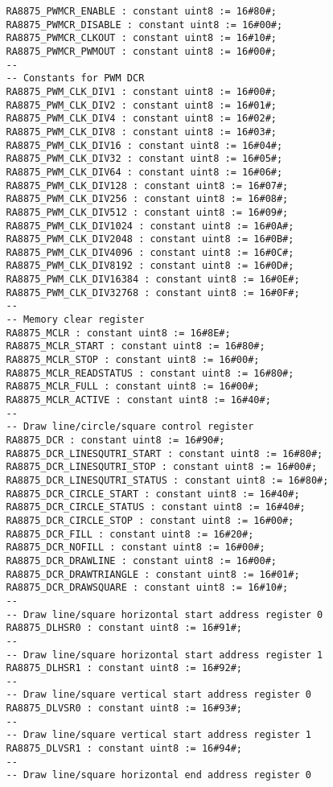 \documentclass[10pt, openany]{book}
\begin{document}
\begin{lstlisting}
   RA8875_PWMCR_ENABLE : constant uint8 := 16#80#;
   RA8875_PWMCR_DISABLE : constant uint8 := 16#00#;
   RA8875_PWMCR_CLKOUT : constant uint8 := 16#10#;
   RA8875_PWMCR_PWMOUT : constant uint8 := 16#00#;
   --
   -- Constants for PWM DCR
   RA8875_PWM_CLK_DIV1 : constant uint8 := 16#00#;
   RA8875_PWM_CLK_DIV2 : constant uint8 := 16#01#;
   RA8875_PWM_CLK_DIV4 : constant uint8 := 16#02#;
   RA8875_PWM_CLK_DIV8 : constant uint8 := 16#03#;
   RA8875_PWM_CLK_DIV16 : constant uint8 := 16#04#;
   RA8875_PWM_CLK_DIV32 : constant uint8 := 16#05#;
   RA8875_PWM_CLK_DIV64 : constant uint8 := 16#06#;
   RA8875_PWM_CLK_DIV128 : constant uint8 := 16#07#;
   RA8875_PWM_CLK_DIV256 : constant uint8 := 16#08#;
   RA8875_PWM_CLK_DIV512 : constant uint8 := 16#09#;
   RA8875_PWM_CLK_DIV1024 : constant uint8 := 16#0A#;
   RA8875_PWM_CLK_DIV2048 : constant uint8 := 16#0B#;
   RA8875_PWM_CLK_DIV4096 : constant uint8 := 16#0C#;
   RA8875_PWM_CLK_DIV8192 : constant uint8 := 16#0D#;
   RA8875_PWM_CLK_DIV16384 : constant uint8 := 16#0E#;
   RA8875_PWM_CLK_DIV32768 : constant uint8 := 16#0F#;
   --
   -- Memory clear register
   RA8875_MCLR : constant uint8 := 16#8E#;
   RA8875_MCLR_START : constant uint8 := 16#80#;
   RA8875_MCLR_STOP : constant uint8 := 16#00#;
   RA8875_MCLR_READSTATUS : constant uint8 := 16#80#;
   RA8875_MCLR_FULL : constant uint8 := 16#00#;
   RA8875_MCLR_ACTIVE : constant uint8 := 16#40#;
   --
   -- Draw line/circle/square control register
   RA8875_DCR : constant uint8 := 16#90#;
   RA8875_DCR_LINESQUTRI_START : constant uint8 := 16#80#;
   RA8875_DCR_LINESQUTRI_STOP : constant uint8 := 16#00#;
   RA8875_DCR_LINESQUTRI_STATUS : constant uint8 := 16#80#;
   RA8875_DCR_CIRCLE_START : constant uint8 := 16#40#;
   RA8875_DCR_CIRCLE_STATUS : constant uint8 := 16#40#;
   RA8875_DCR_CIRCLE_STOP : constant uint8 := 16#00#;
   RA8875_DCR_FILL : constant uint8 := 16#20#;
   RA8875_DCR_NOFILL : constant uint8 := 16#00#;
   RA8875_DCR_DRAWLINE : constant uint8 := 16#00#;
   RA8875_DCR_DRAWTRIANGLE : constant uint8 := 16#01#;
   RA8875_DCR_DRAWSQUARE : constant uint8 := 16#10#;
   --
   -- Draw line/square horizontal start address register 0
   RA8875_DLHSR0 : constant uint8 := 16#91#;
   --
   -- Draw line/square horizontal start address register 1
   RA8875_DLHSR1 : constant uint8 := 16#92#;
   --
   -- Draw line/square vertical start address register 0
   RA8875_DLVSR0 : constant uint8 := 16#93#;
   --
   -- Draw line/square vertical start address register 1
   RA8875_DLVSR1 : constant uint8 := 16#94#;
   --
   -- Draw line/square horizontal end address register 0

\end{lstlisting}
\end{document}
